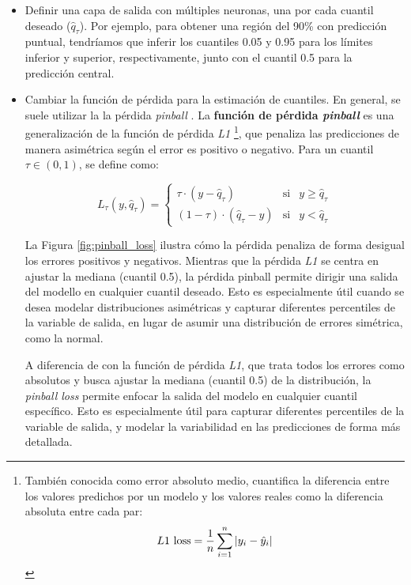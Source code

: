 \begin{itemize}

    \item Definir una capa de salida con múltiples neuronas, una por cada cuantil deseado ($\hat{q}_\tau$). 
    Por ejemplo, para obtener una región del 90\% con predicción puntual, tendríamos que inferir     
    los cuantiles 0.05 y 0.95 para los límites inferior y superior, respectivamente, junto con el cuantil 0.5 
    para la predicción central.

    \item Cambiar la función de pérdida para la estimación de cuantiles. En general, se suele utilizar la 
    la pérdida \textit{pinball} \cite{steinwart2011}.
    La \textbf{función de pérdida \textit{pinball}} es una generalización de la función de pérdida 
    \textit{L1}
    \footnote{
        También conocida como error absoluto medio, cuantifica la diferencia entre los valores predichos por 
        un modelo y los valores reales como la diferencia absoluta entre cada par:
        $$
        L1\textnormal{ loss} = \frac{1}{n} \sum_{i=1}^n |y_i-\hat{y}_i|
        $$
    }, 
    que penaliza las predicciones de manera asimétrica según el error es positivo o negativo. 
    Para un cuantil $\tau \in \left( 0,1\right)$, se define como:

    $$
    L_\tau(y,\hat{q}_\tau) = \left\{
        \begin{array}{rcl}
            \tau \cdot (y-\hat{q}_\tau) & \mbox{si} & y \ge \hat{q}_\tau
            \\
            (1-\tau) \cdot (\hat{q}_\tau-y) & \mbox{si} & y < \hat{q}_\tau
        \end{array}
    \right.
    $$

    La Figura \ref{fig:pinball_loss} ilustra cómo la pérdida penaliza de forma desigual los errores positivos
    y negativos. Mientras que la pérdida \textit{L1} se centra en ajustar la mediana (cuantil 0.5), 
    la pérdida pinball permite dirigir una salida del modello en cualquier cuantil deseado. 
    Esto es especialmente útil cuando se desea modelar distribuciones asimétricas y capturar diferentes 
    percentiles de la variable de salida, en lugar de asumir una distribución de errores simétrica, como la 
    normal.
    
    A diferencia de con la función de pérdida \textit{L1}, que trata todos los errores como 
    absolutos y busca ajustar la mediana (cuantil 0.5) de la distribución, la \textit{pinball loss} permite 
    enfocar la salida del modelo en cualquier cuantil específico. Esto es especialmente útil para
    capturar diferentes percentiles de la variable de salida, y modelar la variabilidad en las predicciones 
    de forma más detallada.


\end{itemize}

